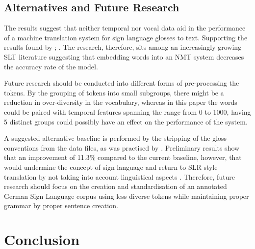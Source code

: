 \subsection{Alternatives and Future Research}

The results suggest that neither temporal nor vocal data aid in the performance of a machine translation system for sign language glosses to text. Supporting the results found by \citealt{camgoz2018neural}; \citealt{qi2018and}. The research, therefore, sits among an increasingly growing SLT literature suggesting that embedding words into an NMT system decreases the accuracy rate of the model.

Future research should be conducted into different forms of pre-processing the tokens. By the grouping of tokens into small subgroups, there might be a reduction in over-diversity in the vocabulary, whereas in this paper the words could be paired with temporal features spanning the range from 0 to 1000, having 5 distinct groups could possibly have an effect on the performance of the system.

A suggested alternative baseline is performed by the stripping of the gloss-conventions \cite{konradoffentliches} from the data files, as was practised by \citet{othman2012english}. Preliminary results show that an improvement of 11.3\% compared to the current baseline, however, that would undermine the concept of sign language and return to SLR style translation by not taking into account linguistical aspects \cite{camgoz2018neural}. Therefore, future research should focus on the creation and standardisation of an annotated German Sign Language corpus using less diverse tokens while maintaining proper grammar by proper sentence creation.


\section{Conclusion}

